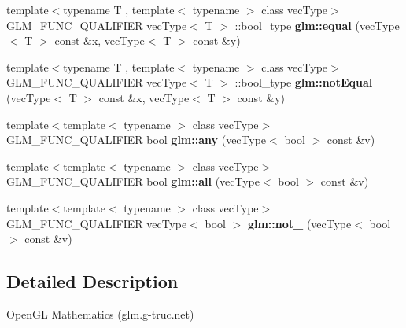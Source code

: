 \begin{DoxyCompactItemize}
\item 
\hypertarget{namespaceglm_a8174e161228847c68ded7a51742425e7}{{\footnotesize template$<$typename T , template$<$ typename $>$ class vec\-Type$>$ }\\\-G\-L\-M\-\_\-\-F\-U\-N\-C\-\_\-\-Q\-U\-A\-L\-I\-F\-I\-E\-R vec\-Type$<$ \-T $>$\*
\-::bool\-\_\-type {\bfseries glm\-::equal} (vec\-Type$<$ \-T $>$ const \&x, vec\-Type$<$ \-T $>$ const \&y)}\label{namespaceglm_a8174e161228847c68ded7a51742425e7}

\item 
\hypertarget{namespaceglm_ab8dd4009e5f297ce53e1132ca4468745}{{\footnotesize template$<$typename T , template$<$ typename $>$ class vec\-Type$>$ }\\\-G\-L\-M\-\_\-\-F\-U\-N\-C\-\_\-\-Q\-U\-A\-L\-I\-F\-I\-E\-R vec\-Type$<$ \-T $>$\*
\-::bool\-\_\-type {\bfseries glm\-::not\-Equal} (vec\-Type$<$ \-T $>$ const \&x, vec\-Type$<$ \-T $>$ const \&y)}\label{namespaceglm_ab8dd4009e5f297ce53e1132ca4468745}

\item 
\hypertarget{namespaceglm_a494d9a71f7d8bfc6977d56fcbaf2cbd0}{{\footnotesize template$<$template$<$ typename $>$ class vec\-Type$>$ }\\\-G\-L\-M\-\_\-\-F\-U\-N\-C\-\_\-\-Q\-U\-A\-L\-I\-F\-I\-E\-R bool {\bfseries glm\-::any} (vec\-Type$<$ bool $>$ const \&v)}\label{namespaceglm_a494d9a71f7d8bfc6977d56fcbaf2cbd0}

\item 
\hypertarget{namespaceglm_af6fb9ef899892ef120edd2790eefdae2}{{\footnotesize template$<$template$<$ typename $>$ class vec\-Type$>$ }\\\-G\-L\-M\-\_\-\-F\-U\-N\-C\-\_\-\-Q\-U\-A\-L\-I\-F\-I\-E\-R bool {\bfseries glm\-::all} (vec\-Type$<$ bool $>$ const \&v)}\label{namespaceglm_af6fb9ef899892ef120edd2790eefdae2}

\item 
\hypertarget{namespaceglm_aa4719d6b84e62e207eb11ca0b464b6dd}{{\footnotesize template$<$template$<$ typename $>$ class vec\-Type$>$ }\\\-G\-L\-M\-\_\-\-F\-U\-N\-C\-\_\-\-Q\-U\-A\-L\-I\-F\-I\-E\-R vec\-Type$<$ bool $>$ {\bfseries glm\-::not\-\_\-} (vec\-Type$<$ bool $>$ const \&v)}\label{namespaceglm_aa4719d6b84e62e207eb11ca0b464b6dd}

\end{DoxyCompactItemize}


\subsection{\-Detailed \-Description}
\-Open\-G\-L \-Mathematics (glm.\-g-\/truc.\-net)

